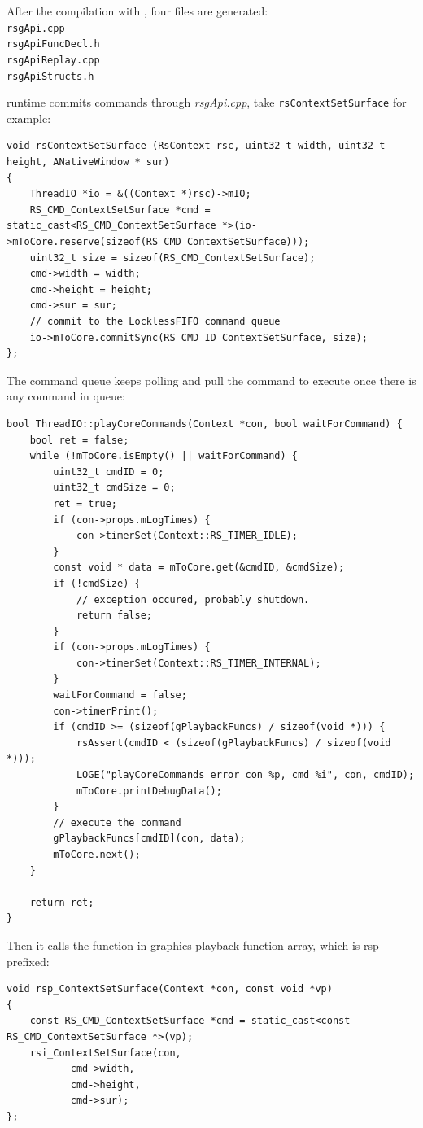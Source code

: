 After the compilation with \slang{}, four files are generated:\\
\verb|rsgApi.cpp|\\ 
\verb|rsgApiFuncDecl.h|\\
\verb|rsgApiReplay.cpp|\\ 
\verb|rsgApiStructs.h|

\RS{} runtime commits commands through \textit{rsgApi.cpp}, take \verb|rsContextSetSurface| for example:
\begin{lstlisting}
void rsContextSetSurface (RsContext rsc, uint32_t width, uint32_t height, ANativeWindow * sur)
{
    ThreadIO *io = &((Context *)rsc)->mIO;
    RS_CMD_ContextSetSurface *cmd = static_cast<RS_CMD_ContextSetSurface *>(io->mToCore.reserve(sizeof(RS_CMD_ContextSetSurface)));
    uint32_t size = sizeof(RS_CMD_ContextSetSurface);
    cmd->width = width;
    cmd->height = height;
    cmd->sur = sur;
    // commit to the LocklessFIFO command queue
    io->mToCore.commitSync(RS_CMD_ID_ContextSetSurface, size);
};
\end{lstlisting}

The command queue keeps polling and pull the command to execute once there is any command in queue:
\begin{lstlisting}
bool ThreadIO::playCoreCommands(Context *con, bool waitForCommand) {
    bool ret = false;
    while (!mToCore.isEmpty() || waitForCommand) {
        uint32_t cmdID = 0;
        uint32_t cmdSize = 0;
        ret = true;
        if (con->props.mLogTimes) {
            con->timerSet(Context::RS_TIMER_IDLE);
        }   
        const void * data = mToCore.get(&cmdID, &cmdSize);
        if (!cmdSize) {
            // exception occured, probably shutdown.
            return false;
        }   
        if (con->props.mLogTimes) {
            con->timerSet(Context::RS_TIMER_INTERNAL);
        }   
        waitForCommand = false;
        con->timerPrint();
        if (cmdID >= (sizeof(gPlaybackFuncs) / sizeof(void *))) {
            rsAssert(cmdID < (sizeof(gPlaybackFuncs) / sizeof(void *)));
            LOGE("playCoreCommands error con %p, cmd %i", con, cmdID);
            mToCore.printDebugData();
        }   
        // execute the command 
        gPlaybackFuncs[cmdID](con, data);
        mToCore.next();
    }   

    return ret;
}
\end{lstlisting}

Then it calls the function in graphics playback function array, which is rsp prefixed:
\begin{lstlisting}
void rsp_ContextSetSurface(Context *con, const void *vp)
{
    const RS_CMD_ContextSetSurface *cmd = static_cast<const RS_CMD_ContextSetSurface *>(vp);
    rsi_ContextSetSurface(con,
           cmd->width,
           cmd->height,
           cmd->sur);
};
\end{lstlisting}

